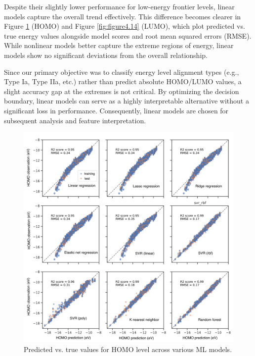 Despite their slightly lower performance for low-energy frontier levels, linear models capture the overall trend effectively. This difference becomes clearer in Figure \ref{fig:figure4.13} (HOMO) and Figure \ref{fig:figure4.14} (LUMO), which plot predicted vs. true energy values alongside model scores and root mean squared errors (RMSE). While nonlinear models better capture the extreme regions of energy, linear models show no significant deviations from the overall relationship.

Since our primary objective was to classify energy level alignment types (e.g., Type Ia, Type IIa, etc.) rather than predict absolute HOMO/LUMO values, a slight accuracy gap at the extremes is not critical. By optimizing the decision boundary, linear models can serve as a highly interpretable alternative without a significant loss in performance. Consequently, linear models are chosen for subsequent analysis and feature interpretation.

\begin{figure}[htbp]
    \centering
    \includegraphics[width=\textwidth]{figures/HT-ML/figure4-13.png}
    \caption{Predicted vs. true values for HOMO level across various ML models.}
    \label{fig:figure4.13}
\end{figure}

